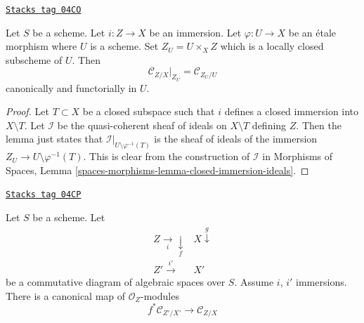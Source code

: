 \begin{lemma}
\label{spaces-more-morphisms-lemma-etale-conormal}
\href{https://stacks.math.columbia.edu/tag/04CO}{\texttt{Stacks tag 04CO}}

Let $S$ be a scheme. Let $i : Z \to X$ be an immersion.
Let $\varphi : U \to X$ be an \'etale morphism where $U$ is a scheme.
Set $Z_U = U \times_X Z$ which is a locally closed subscheme of $U$.
Then
$$
\mathcal{C}_{Z/X}|_{Z_U} = \mathcal{C}_{Z_U/U}
$$
canonically and functorially in $U$.
\end{lemma}

\begin{proof}
Let $T \subset X$ be a closed subspace such that $i$ defines a closed
immersion into $X \setminus T$.
Let $\mathcal{I}$ be the quasi-coherent sheaf of ideals on
$X \setminus T$ defining $Z$. Then the lemma just states that
$\mathcal{I}|_{U \setminus \varphi^{-1}(T)}$ is the sheaf of ideals of
the immersion $Z_U \to U \setminus \varphi^{-1}(T)$.
This is clear from the construction of $\mathcal{I}$ in
Morphisms of Spaces, Lemma \ref{spaces-morphisms-lemma-closed-immersion-ideals}.
\end{proof}

\begin{lemma}
\label{spaces-more-morphisms-lemma-conormal-functorial}
\href{https://stacks.math.columbia.edu/tag/04CP}{\texttt{Stacks tag 04CP}}

Let $S$ be a scheme. Let
$$
\begin{array}{cc}Z \underset{i}{\longrightarrow}\underset{f}{\downarrow} & X \overset{g}{\downarrow} \\ Z' \overset{i'}{\longrightarrow} & X'\end{array}
$$
be a commutative diagram of algebraic spaces over $S$.
Assume $i$, $i'$ immersions. There is a canonical map
of $\mathcal{O}_Z$-modules
$$
f^*\mathcal{C}_{Z'/X'}
\longrightarrow
\mathcal{C}_{Z/X}
$$
\end{lemma}

